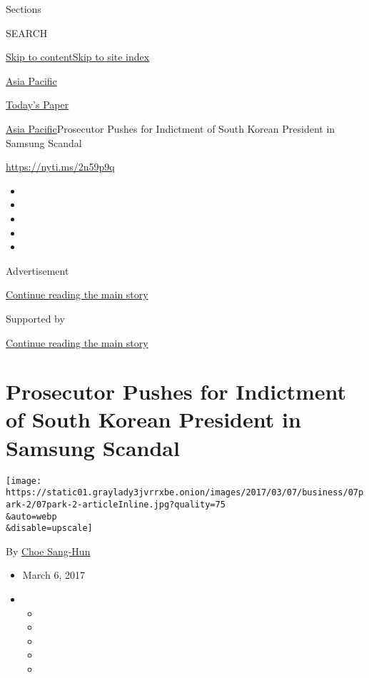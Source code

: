 Sections

SEARCH

\protect\hyperlink{site-content}{Skip to
content}\protect\hyperlink{site-index}{Skip to site index}

\href{https://www.nytimes3xbfgragh.onion/section/world/asia}{Asia
Pacific}

\href{https://myaccount.nytimes3xbfgragh.onion/auth/login?response_type=cookie\&client_id=vi}{}

\href{https://www.nytimes3xbfgragh.onion/section/todayspaper}{Today's
Paper}

\href{/section/world/asia}{Asia Pacific}\textbar{}Prosecutor Pushes for
Indictment of South Korean President in Samsung Scandal

\url{https://nyti.ms/2n59p9q}

\begin{itemize}
\item
\item
\item
\item
\item
\end{itemize}

Advertisement

\protect\hyperlink{after-top}{Continue reading the main story}

Supported by

\protect\hyperlink{after-sponsor}{Continue reading the main story}

\hypertarget{prosecutor-pushes-for-indictment-of-south-korean-president-in-samsung-scandal}{%
\section{Prosecutor Pushes for Indictment of South Korean President in
Samsung
Scandal}\label{prosecutor-pushes-for-indictment-of-south-korean-president-in-samsung-scandal}}

\texttt{[image: https://static01.graylady3jvrrxbe.onion/images/2017/03/07/business/07park-2/07park-2-articleInline.jpg?quality=75\\\&auto=webp\\\&disable=upscale]}

By \href{http://www.nytimes3xbfgragh.onion/by/choe-sang-hun}{Choe
Sang-Hun}

\begin{itemize}
\item
  March 6, 2017
\item
  \begin{itemize}
  \item
  \item
  \item
  \item
  \item
  \end{itemize}
\end{itemize}

